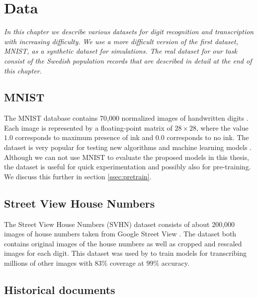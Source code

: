 \chapter{Data}

\textit{In this chapter we describe various datasets for digit recognition and transcription with increasing difficulty. We use a more difficult version of the first dataset, MNIST, as a synthetic dataset for simulations. The real dataset for our task consist of the Swedish population records that are described in detail at the end of this chapter.}


\section{MNIST}

The MNIST database contains 70,000 normalized images of handwritten digits \cite{MNIST_orig}.
Each image is represented by a floating-point matrix of $28 \times 28$, where the value $1.0$ corresponds to maximum presence of ink and $0.0$ corresponds to no ink.
The dataset is very popular for testing new algorithms and machine learning models \cite{MNIST}.
Although we can not use MNIST to evaluate the proposed models in this thesis, the dataset is useful for quick experimentation and possibly also for pre-training. We discuss this further in section \ref{ssec:pretrain}.

\section{Street View House Numbers}

The Street View House Numbers (SVHN) dataset consists of about 200,000 images of house numbers taken from Google Street View \cite{SVHN}. The dataset both contains original images of the house numbers as well as cropped and rescaled images for each digit. This dataset was used by \textcite{multidigit_streetview} to train models for transcribing millions of other images with $83\%$ coverage at $99\%$ accuracy.

\section{Historical documents}

